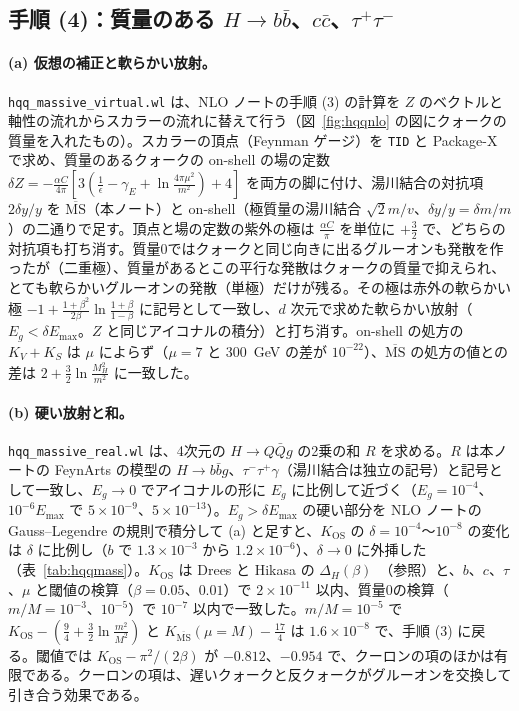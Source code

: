 \documentclass[a4paper,10pt]{ltjsarticle}
\newcommand{\MSbar}{\overline{\mathrm{MS}}}
\begin{document}
\subsection{手順 (4)：質量のある $H\to b\bar b$、$c\bar c$、$\tau^+\tau^-$}\label{sec:step4}

\paragraph{(a) 仮想の補正と軟らかい放射。}\texttt{hqq\_massive\_virtual.wl} は、NLO ノートの手順 (3) の計算を $Z$ のベクトルと軸性の流れからスカラーの流れに替えて行う（図~\ref{fig:hqqnlo} の図にクォークの質量を入れたもの）。スカラーの頂点（Feynman ゲージ）を \texttt{TID} と Package-X で求め、質量のあるクォークの on-shell の場の定数 $\delta Z=-\frac{\alpha C}{4\pi}[3(\frac1\epsilon-\gamma_E+\ln\frac{4\pi\mu^2}{m^2})+4]$ を両方の脚に付け、湯川結合の対抗項 $2\delta y/y$ を $\MSbar$（本ノート）と on-shell（極質量の湯川結合 $\sqrt2m/v$、$\delta y/y=\delta m/m$）の二通りで足す。頂点と場の定数の紫外の極は $\frac{\alpha C}\pi$ を単位に $+\frac32$ で、どちらの対抗項も打ち消す。質量0ではクォークと同じ向きに出るグルーオンも発散を作ったが（二重極）、質量があるとこの平行な発散はクォークの質量で抑えられ、とても軟らかいグルーオンの発散（単極）だけが残る。その極は赤外の軟らかい極 $-1+\frac{1+\beta^2}{2\beta}\ln\frac{1+\beta}{1-\beta}$ に記号として一致し、$d$ 次元で求めた軟らかい放射（$E_g<\delta E_{\max}$。$Z$ と同じアイコナルの積分）と打ち消す。on-shell の処方の $K_V+K_S$ は $\mu$ によらず（$\mu=7$ と $300$~GeV の差が $10^{-22}$）、$\MSbar$ の処方の値との差は $2+\frac32\ln\frac{M_H^2}{m^2}$ に一致した。

\paragraph{(b) 硬い放射と和。}\texttt{hqq\_massive\_real.wl} は、4次元の $H\to Q\bar Qg$ の2乗の和 $R$ を求める。$R$ は本ノートの FeynArts の模型の $H\to b\bar bg$、$\tau^-\tau^+\gamma$（湯川結合は独立の記号）と記号として一致し、$E_g\to0$ でアイコナルの形に $E_g$ に比例して近づく（$E_g=10^{-4}$、$10^{-6}E_{\max}$ で $5\times10^{-9}$、$5\times10^{-13}$）。$E_g>\delta E_{\max}$ の硬い部分を NLO ノートの Gauss--Legendre の規則で積分して (a) と足すと、$K_{\mathrm{OS}}$ の $\delta=10^{-4}$〜$10^{-8}$ の変化は $\delta$ に比例し（$b$ で $1.3\times10^{-3}$ から $1.2\times10^{-6}$）、$\delta\to0$ に外挿した（表~\ref{tab:hqqmass}）。$K_{\mathrm{OS}}$ は Drees と Hikasa の $\Delta_H(\beta)$~\cite{dh90}（参照）と、$b$、$c$、$\tau$、$\mu$ と閾値の検算（$\beta=0.05$、$0.01$）で $2\times10^{-11}$ 以内、質量0の検算（$m/M=10^{-3}$、$10^{-5}$）で $10^{-7}$ 以内で一致した。$m/M=10^{-5}$ で $K_{\mathrm{OS}}-(\frac94+\frac32\ln\frac{m^2}{M^2})$ と $K_{\MSbar}(\mu=M)-\frac{17}4$ は $1.6\times10^{-8}$ で、手順 (3) に戻る。閾値では $K_{\mathrm{OS}}-\pi^2/(2\beta)$ が $-0.812$、$-0.954$ で、クーロンの項のほかは有限である。クーロンの項は、遅いクォークと反クォークがグルーオンを交換して引き合う効果である。
\end{document}
